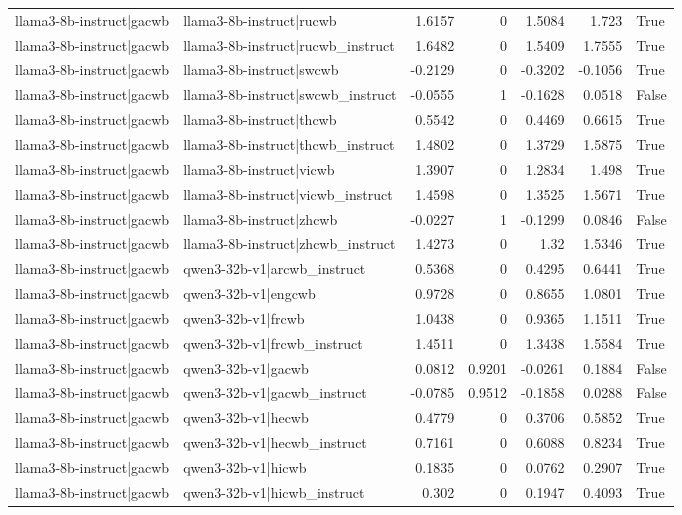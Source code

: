 \begin{table}
\begin{tabular}{l l r r r r l}
llama3-8b-instruct|gacwb & llama3-8b-instruct|rucwb & 1.6157 & 0 & 1.5084 & 1.723 & True \\
llama3-8b-instruct|gacwb & llama3-8b-instruct|rucwb_instruct & 1.6482 & 0 & 1.5409 & 1.7555 & True \\
llama3-8b-instruct|gacwb & llama3-8b-instruct|swcwb & -0.2129 & 0 & -0.3202 & -0.1056 & True \\
llama3-8b-instruct|gacwb & llama3-8b-instruct|swcwb_instruct & -0.0555 & 1 & -0.1628 & 0.0518 & False \\
llama3-8b-instruct|gacwb & llama3-8b-instruct|thcwb & 0.5542 & 0 & 0.4469 & 0.6615 & True \\
llama3-8b-instruct|gacwb & llama3-8b-instruct|thcwb_instruct & 1.4802 & 0 & 1.3729 & 1.5875 & True \\
llama3-8b-instruct|gacwb & llama3-8b-instruct|vicwb & 1.3907 & 0 & 1.2834 & 1.498 & True \\
llama3-8b-instruct|gacwb & llama3-8b-instruct|vicwb_instruct & 1.4598 & 0 & 1.3525 & 1.5671 & True \\
llama3-8b-instruct|gacwb & llama3-8b-instruct|zhcwb & -0.0227 & 1 & -0.1299 & 0.0846 & False \\
llama3-8b-instruct|gacwb & llama3-8b-instruct|zhcwb_instruct & 1.4273 & 0 & 1.32 & 1.5346 & True \\
llama3-8b-instruct|gacwb & qwen3-32b-v1|arcwb_instruct & 0.5368 & 0 & 0.4295 & 0.6441 & True \\
llama3-8b-instruct|gacwb & qwen3-32b-v1|engcwb & 0.9728 & 0 & 0.8655 & 1.0801 & True \\
llama3-8b-instruct|gacwb & qwen3-32b-v1|frcwb & 1.0438 & 0 & 0.9365 & 1.1511 & True \\
llama3-8b-instruct|gacwb & qwen3-32b-v1|frcwb_instruct & 1.4511 & 0 & 1.3438 & 1.5584 & True \\
llama3-8b-instruct|gacwb & qwen3-32b-v1|gacwb & 0.0812 & 0.9201 & -0.0261 & 0.1884 & False \\
llama3-8b-instruct|gacwb & qwen3-32b-v1|gacwb_instruct & -0.0785 & 0.9512 & -0.1858 & 0.0288 & False \\
llama3-8b-instruct|gacwb & qwen3-32b-v1|hecwb & 0.4779 & 0 & 0.3706 & 0.5852 & True \\
llama3-8b-instruct|gacwb & qwen3-32b-v1|hecwb_instruct & 0.7161 & 0 & 0.6088 & 0.8234 & True \\
llama3-8b-instruct|gacwb & qwen3-32b-v1|hicwb & 0.1835 & 0 & 0.0762 & 0.2907 & True \\
llama3-8b-instruct|gacwb & qwen3-32b-v1|hicwb_instruct & 0.302 & 0 & 0.1947 & 0.4093 & True \\

\end{tabular}
\end{table}
